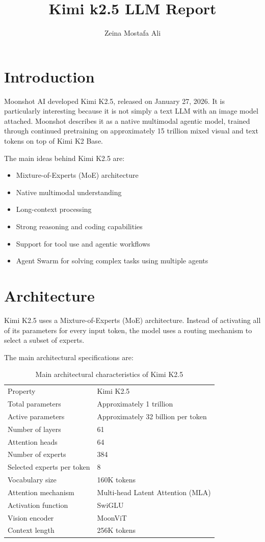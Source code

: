 \documentclass{article}
\title{Kimi k2.5 LLM Report}
\author{Zeina Mostafa Ali }
\begin{document}
\maketitle

\section{Introduction}
Moonshot AI developed Kimi K2.5, released on January 27, 2026. It is particularly interesting because it is not simply a text LLM with an image model attached. Moonshot describes it as a native multimodal agentic model, trained through continued pretraining on approximately 15 trillion mixed visual and text tokens on top of Kimi K2 Base.

The main ideas behind Kimi K2.5 are:

\begin{itemize}
\item Mixture-of-Experts (MoE) architecture
\item Native multimodal understanding
\item Long-context processing
\item Strong reasoning and coding capabilities
\item Support for tool use and agentic workflows
\item Agent Swarm for solving complex tasks using multiple agents
\end{itemize}

\section{Architecture}
Kimi K2.5 uses a Mixture-of-Experts (MoE) architecture. Instead of activating all of its parameters for every input token, the model uses a routing mechanism to select a subset of experts.

The main architectural specifications are:

\begin{table}[h]
\centering
\begin{tabular}{ll}

Property & Kimi K2.5 \\

Total parameters & Approximately 1 trillion \\
Active parameters & Approximately 32 billion per token \\
Number of layers & 61 \\
Attention heads & 64 \\
Number of experts & 384 \\
Selected experts per token & 8 \\
Vocabulary size & 160K tokens \\
Attention mechanism & Multi-head Latent Attention (MLA) \\
Activation function & SwiGLU \\
Vision encoder & MoonViT \\
Context length & 256K tokens \\
\hline
\end{tabular}
\caption{Main architectural characteristics of Kimi K2.5}
\end{table}
\end{document}
